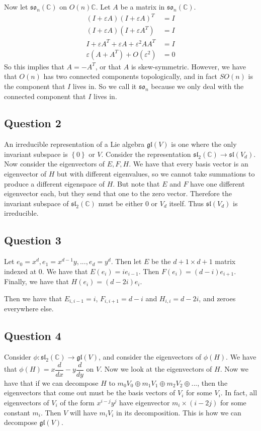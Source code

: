 \documentclass[]{article}
\begin{document}
Now let $\mathfrak{so}_n(\mathbb{C})$ on $O(n)\mathbb{C}$. Let $A$ be a matrix in $\mathfrak{so}_n(\mathbb{C})$.
\begin{align*}
	(I + \varepsilon A)(I + \varepsilon A)^T &= I\\
	(I + \varepsilon A)(I + \varepsilon A^T) &= I\\
	I + \varepsilon A^T + \varepsilon A + \varepsilon^2 A A^T &= I\\
	\varepsilon (A + A^T) + O(\varepsilon^2) &= 0
\end{align*}
So this implies that $A = - A^T$, or that $A$ is skew-symmetric. However, we have that $O(n)$ has two connected components topologically, and in fact $SO(n)$ is the component that $I$ lives in. So we call it $\mathfrak{so}_n$ because we only deal with the connected component that $I$ lives in. 



\subsection*{Question 2}
An irreducible representation of a Lie algebra $\mathfrak{gl}(V)$ is one where the only invariant subspace is $\left\{ 0 \right\}$ or $V$. Consider the representation $\mathfrak{sl}_2(\mathbb{C}) \rightarrow \mathfrak{sl}(V_d)$. Now consider the eigenvectors of $E, F, H$. We have that every basis vector is an eigenvector of $H$ but with different eigenvalues, so we cannot take summations to produce a different eigenspace of $H$. But note that $E$ and $F$ have one different eigenvector each, but they send that one to the zero vector. Therefore the invariant subspace of $\mathfrak{sl}_2(\mathbb{C})$ must be either $0$ or $V_d$ itself. Thus $\mathfrak{sl}(V_d)$ is irreducible. 
\subsection*{Question 3}
Let $e_0 = x^d, e_1 = x^{d - 1} y , ... , e_d = y^d$. Then let $E$ be the $d + 1 \times d + 1$ matrix indexed at 0. We have that $E(e_i) = i e_{i - 1}$. Then $F(e_i) = (d - i) e_{i + 1}$. Finally, we have that $H(e_i) = (d - 2i) e_i$. 

Then we have that $E_{i, i - 1} = i$, $F_{i, i + 1} = d - i$ and $H_{i, i} = d - 2i$, and zeroes everywhere else. 

\subsection*{Question 4}
Consider $\phi: \mathfrak{sl}_2(\mathbb{C}) \rightarrow \mathfrak{gl}(V)$, and consider the eigenvectors of $\phi(H)$. We have that $\phi(H) = x \dfrac{d}{dx} - y \dfrac{d}{dy}$ on $V$. Now we look at the eigenvectors of $H$. Now we have that if we can decompose $H$ to $m_0 V_0 \oplus m_1 V_1 \oplus m_2 V_2 \oplus ... $, then the eigenvectors that come out must be the basis vectors of $V_i$ for some $V_i$. In fact, all eigenvectors of $V_i$ of the form $x^{i - j} y^{j}$ have eigenvector $m_i \times (i - 2j)$ for some constant $m_i$. Then $V$ will have $m_i V_i$ in its decomposition. This is how we can decompose $\mathfrak{gl}(V)$. 
\end{document}
